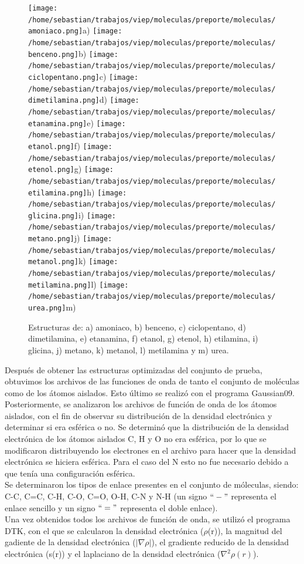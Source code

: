 \documentclass[12pt,letterpaper]{article}
\begin{document}
\begin{figure}[H]
\centering
\texttt{[image: /home/sebastian/trabajos/viep/moleculas/preporte/moleculas/amoniaco.png]}a)
\texttt{[image: /home/sebastian/trabajos/viep/moleculas/preporte/moleculas/benceno.png]}b)
\texttt{[image: /home/sebastian/trabajos/viep/moleculas/preporte/moleculas/ciclopentano.png]}c)
\texttt{[image: /home/sebastian/trabajos/viep/moleculas/preporte/moleculas/dimetilamina.png]}d)
\texttt{[image: /home/sebastian/trabajos/viep/moleculas/preporte/moleculas/etanamina.png]}e)
\texttt{[image: /home/sebastian/trabajos/viep/moleculas/preporte/moleculas/etanol.png]}f)
\texttt{[image: /home/sebastian/trabajos/viep/moleculas/preporte/moleculas/etenol.png]}g)
\texttt{[image: /home/sebastian/trabajos/viep/moleculas/preporte/moleculas/etilamina.png]}h)
\texttt{[image: /home/sebastian/trabajos/viep/moleculas/preporte/moleculas/glicina.png]}i)
\texttt{[image: /home/sebastian/trabajos/viep/moleculas/preporte/moleculas/metano.png]}j)
\texttt{[image: /home/sebastian/trabajos/viep/moleculas/preporte/moleculas/metanol.png]}k)
\texttt{[image: /home/sebastian/trabajos/viep/moleculas/preporte/moleculas/metilamina.png]}l)
\texttt{[image: /home/sebastian/trabajos/viep/moleculas/preporte/moleculas/urea.png]}m)
\caption{Estructuras de: a) amoniaco, b) benceno,  c) ciclopentano, d) dimetilamina, e) etanamina, f) etanol, g) etenol, h) etilamina, i) glicina, j) metano, k) metanol, l) metilamina y m) urea.}
\end{figure} 

Después de obtener las estructuras optimizadas  del conjunto de prueba, obtuvimos los archivos de las funciones de  onda de tanto el conjunto de moléculas como de los átomos aislados. Esto último se realizó con el programa Gaussian09.\\
Posteriormente, se analizaron los archivos de función de onda de los átomos aislados, con el fin de observar su distribución de la densidad electrónica y determinar si era esférica o no. Se determinó que la distribución de la densidad electrónica de los átomos aislados C, H y O no era esférica, por lo que se modificaron distribuyendo los electrones en el archivo para hacer que la densidad electrónica se hiciera esférica. Para el caso del N esto no fue necesario debido a que tenía una configuración esférica.\\
Se determinaron los tipos de enlace presentes en el conjunto de móleculas, siendo: C-C, C=C, C-H, C-O, C=O, O-H, C-N y N-H (un signo $``-"$ representa el enlace sencillo y un signo $`` = "$ representa el doble enlace).\\ 
Una vez obtenidos todos los archivos de función de onda, se utilizó el programa DTK, con el que se calcularon la densidad electrónica ($\rho$(r)), la magnitud del gadiente de la densidad electrónica ($|\nabla\rho|$), el gradiente reducido de la densidad electrónica (s(r)) y el laplaciano de la densidad electrónica ($\nabla^2\rho(r)$).
\end{document}
